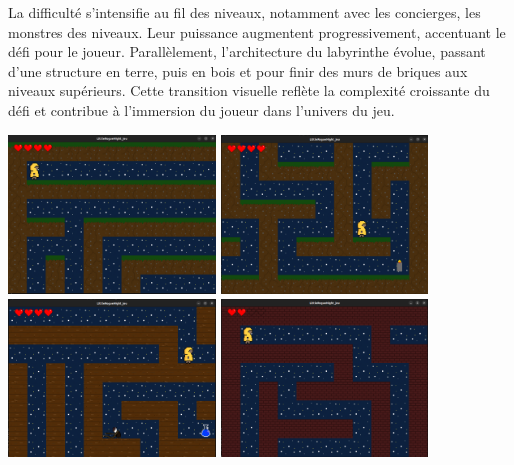 \documentclass[10pt]{article}
\begin{document}
La difficulté s'intensifie au fil des niveaux, notamment avec les \gls{concierges}, les monstres des niveaux. Leur puissance augmentent progressivement, accentuant le défi pour le joueur. Parallèlement, l'architecture du labyrinthe évolue, passant d'une structure en terre, puis en bois et pour finir des murs de briques aux niveaux supérieurs. Cette transition visuelle reflète la complexité croissante du défi et contribue à l'immersion du joueur dans l'univers du jeu.\\
\begin{center}
\includegraphics[width=5.5cm]{niveau_un.png}
\includegraphics[width=5.5cm]{fin_niveau_un.png}
\includegraphics[width=5.5cm]{potion_et_monstre.png}
\includegraphics[width=5.5cm]{niveau_trois.png}

\label{fig8}\\
\end{center}
\end{document}
